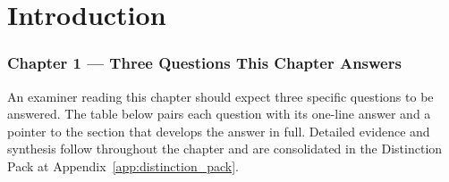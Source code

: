 
\chapter{Introduction}

\subsection*{Chapter 1 --- Three Questions This Chapter Answers}
\label{sec:ch1_three_questions}

\noindent An examiner reading this chapter should expect three specific questions to be answered. The table below pairs each question with its one-line answer and a pointer to the section that develops the answer in full. Detailed evidence and synthesis follow throughout the chapter and are consolidated in the Distinction Pack at Appendix~\ref{app:distinction_pack}.

